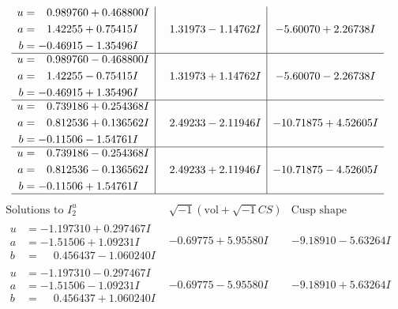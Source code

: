 \documentclass[1p]{elsarticle_modified}
\theoremstyle{definition}
\newcommand{\I}{\sqrt{-1}}
\begin{document}
$$\begin{array}{c|c|c}
\begin{aligned}
u &= \phantom{-}0.989760 + 0.468800 I \\
a &= \phantom{-}1.42255 + 0.75415 I \\
b &= -0.46915 - 1.35496 I\end{aligned}
 & \phantom{-}1.31973 - 1.14762 I & -5.60070 + 2.26738 I \\ \hline\begin{aligned}
u &= \phantom{-}0.989760 - 0.468800 I \\
a &= \phantom{-}1.42255 - 0.75415 I \\
b &= -0.46915 + 1.35496 I\end{aligned}
 & \phantom{-}1.31973 + 1.14762 I & -5.60070 - 2.26738 I \\ \hline\begin{aligned}
u &= \phantom{-}0.739186 + 0.254368 I \\
a &= \phantom{-}0.812536 + 0.136562 I \\
b &= -0.11506 - 1.54761 I\end{aligned}
 & \phantom{-}2.49233 - 2.11946 I & -10.71875 + 4.52605 I \\ \hline\begin{aligned}
u &= \phantom{-}0.739186 - 0.254368 I \\
a &= \phantom{-}0.812536 - 0.136562 I \\
b &= -0.11506 + 1.54761 I\end{aligned}
 & \phantom{-}2.49233 + 2.11946 I & -10.71875 - 4.52605 I\\
 \hline 
 \end{array}$$\newpage$$\begin{array}{c|c|c}  
\text{Solutions to }I^u_{2}& \I (\text{vol} + \sqrt{-1}CS) & \text{Cusp shape}\\
 \hline 
\begin{aligned}
u &= -1.197310 + 0.297467 I \\
a &= -1.51506 + 1.09231 I \\
b &= \phantom{-}0.456437 - 1.060240 I\end{aligned}
 & -0.69775 + 5.95580 I & -9.18910 - 5.63264 I \\ \hline\begin{aligned}
u &= -1.197310 - 0.297467 I \\
a &= -1.51506 - 1.09231 I \\
b &= \phantom{-}0.456437 + 1.060240 I\end{aligned}
 & -0.69775 - 5.95580 I & -9.18910 + 5.63264 I \\ \hline\begin{aligned}

\end{aligned}
\end{array}$$
\end{document}
